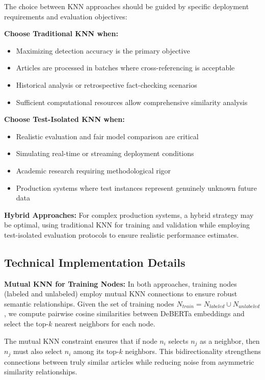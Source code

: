 The choice between KNN approaches should be guided by specific deployment requirements and evaluation objectives:

\textbf{Choose Traditional KNN when:}
\begin{itemize}
    \item Maximizing detection accuracy is the primary objective
    \item Articles are processed in batches where cross-referencing is acceptable
    \item Historical analysis or retrospective fact-checking scenarios
    \item Sufficient computational resources allow comprehensive similarity analysis
\end{itemize}

\textbf{Choose Test-Isolated KNN when:}
\begin{itemize}
    \item Realistic evaluation and fair model comparison are critical
    \item Simulating real-time or streaming deployment conditions
    \item Academic research requiring methodological rigor
    \item Production systems where test instances represent genuinely unknown future data
\end{itemize}

\textbf{Hybrid Approaches:} For complex production systems, a hybrid strategy may be optimal, using traditional KNN for training and validation while employing test-isolated evaluation protocols to ensure realistic performance estimates.

\subsection{Technical Implementation Details}

\textbf{Mutual KNN for Training Nodes:} In both approaches, training nodes (labeled and unlabeled) employ mutual KNN connections to ensure robust semantic relationships. Given the set of training nodes $N_{train} = N_{labeled} \cup N_{unlabeled}$, we compute pairwise cosine similarities between DeBERTa embeddings and select the top-$k$ nearest neighbors for each node.

The mutual KNN constraint ensures that if node $n_i$ selects $n_j$ as a neighbor, then $n_j$ must also select $n_i$ among its top-$k$ neighbors. This bidirectionality strengthens connections between truly similar articles while reducing noise from asymmetric similarity relationships.

